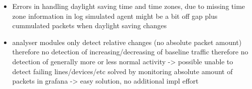 
\begin{itemize}
	\item Errors in handling daylight saving time and time zones, due to missing time zone information in log
		\subitem simulated agent might be a bit off
		\subitem gap plus cummulated packets when daylight saving changes
	\item analyser modules only detect relative changes (no absolute packet amount)
		\subitem therefore no detection of increasing/decreasing of baseline traffic
		\subitem therefore no detection of generally more or less normal activity -> possible unable to detect failing lines/devices/etc
		\subitem solved by monitoring absolute amount of packets in \gls{grafana} -> easy solution, no additional impl effort
\end{itemize}